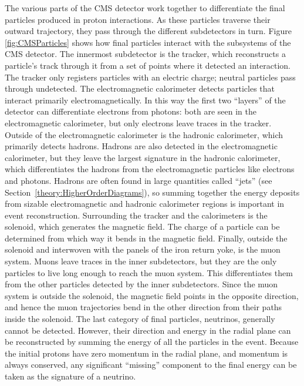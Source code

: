 The various parts of the CMS detector work together to differentiate
the final particles produced in proton interactions.  
As 
these %
particles traverse their outward trajectory,
they pass through the different subdetectors in turn.
Figure \ref{fig:CMSParticles} shows how 
final %
particles 
interact with the subsystems of the CMS detector.  
The innermost subdetector is the tracker, 
which reconstructs a particle's track through it
from a set of points where it detected an interaction.  
The tracker only registers particles with an electric charge; %
neutral particles pass through undetected.  
The electromagnetic calorimeter detects particles that interact
primarily electromagnetically. %
In this way the first two ``layers'' of the detector can differentiate
electrons from photons: 
both are seen in the electromagnetic calorimeter, 
but only electrons leave traces in the tracker.
Outside of the electromagnetic calorimeter is the hadronic calorimeter,
which primarily detects hadrons.  
Hadrons are also detected in the electromagnetic calorimeter,
but they leave the largest signature in the hadronic calorimeter,
which differentiates the hadrons from the electromagnetic particles
like electrons and photons.  
Hadrons are often found in large quantities called ``jets'' 
(see Section~\ref{theory:HigherOrderDiagrams}),
so summing together the energy deposits from sizable electromagnetic 
and hadronic calorimeter regions is important in event reconstruction.  
Surrounding the tracker and the calorimeters is the solenoid,
which generates the magnetic field.
The charge of a particle can be determined from which way it
bends in the magnetic field.
Finally, outside the solenoid and interwoven with the panels of the 
iron return yoke, is the muon system.  
Muons leave traces in the inner subdetectors, 
but they are the only particles to live long enough to reach the
muon system.
This differentiates them from the other particles detected by 
the inner subdetectors.  
Since the muon system is outside the solenoid, 
the magnetic field points in the opposite direction,
and hence the muon trajectories bend in the other direction
from their paths inside the solenoid.  
The last category of 
final particles, neutrinos, 
generally cannot be detected.
However, their direction and energy in the radial plane 
can be reconstructed 
by summing the energy of all the particles in the event.
Because the initial protons have zero momentum in the radial plane, 
and momentum is always conserved, 
any significant ``missing'' component to the final energy
can be taken 
as the signature of 
a neutrino.  

